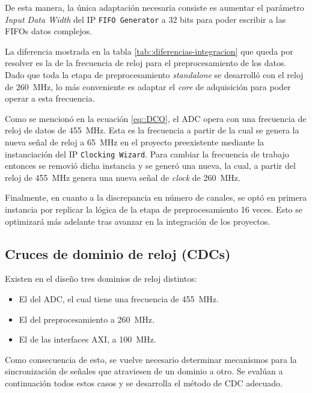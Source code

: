 \documentclass[../../main.tex]{subfiles}
\begin{document}
De esta manera, la única adaptación necesaria consiste es aumentar el parámetro \textit{Input Data Width} del IP \texttt{FIFO Generator} a 32 bits para poder escribir a las FIFOs datos complejos.

La diferencia mostrada en la tabla \ref{tab::diferencias-integracion} que queda por resolver es la de la frecuencia de reloj para el preprocesamiento de los datos. Dado que toda la etapa de preprocesamiento \textit{standalone} se desarrolló con el reloj de 260~MHz, lo más conveniente es adaptar el \textit{core} de adquisición para poder operar a esta frecuencia.

Como se mencionó en la ecuación \ref{eq::DCO}, el ADC opera con una frecuencia de reloj de datos de 455~MHz. Esta es la frecuencia a partir de la cual se genera la nueva señal de reloj a 65~MHz en el proyecto preexistente mediante la instanciación del IP \texttt{Clocking Wizard}. Para cambiar la frecuencia de trabajo entonces se removió dicha instancia y se generó una nueva, la cual, a partir del reloj de 455~MHz genera una nueva señal de \textit{clock} de 260~MHz.

Finalmente, en cuanto a la discrepancia en número de canales, se optó en primera instancia por replicar la lógica de la etapa de preprocesamiento 16 veces. Esto se optimizará más adelante tras avanzar en la integración de los proyectos.

\subsection{Cruces de dominio de reloj (CDCs)}\label{subsec::cdcs-integracion}
Existen en el diseño tres dominios de reloj distintos:
\begin{itemize}
    \item El del ADC, el cual tiene una frecuencia de 455~MHz.
    \item El del preprocesamiento a 260~MHz.
    \item El de las interfaces AXI, a 100~MHz.
\end{itemize}
Como consecuencia de esto, se vuelve necesario determinar mecanismos para la sincronización de señales que atraviesen de un dominio a otro. Se evalúan a continuación todos estos casos y se desarrolla el método de CDC adecuado.
\end{document}
